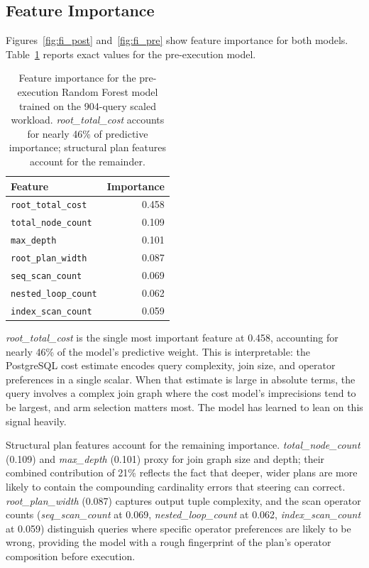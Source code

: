 \documentclass[sigconf,natbib=false]{article}
\newcommand{\postgres}{PostgreSQL}
\newcommand{\feat}[1]{\textit{#1}}
\begin{document}
\subsection{Feature Importance}
\label{sec:ml:features}

Figures~\ref{fig:fi_post} and~\ref{fig:fi_pre} show feature importance for both models.
Table~\ref{tab:feature_imp} reports exact values for the pre-execution model.

\begin{table}[ht]
  \centering
  \caption{Feature importance for the pre-execution Random Forest model trained on the
  904-query scaled workload. \feat{root\_total\_cost} accounts for nearly 46\% of
  predictive importance; structural plan features account for the remainder.}
  \label{tab:feature_imp}
  \small
  \begin{tabular}{@{}lr@{}}
    \toprule
    \textbf{Feature} & \textbf{Importance} \\
    \midrule
    \texttt{root\_total\_cost}   & 0.458 \\
    \texttt{total\_node\_count}  & 0.109 \\
    \texttt{max\_depth}          & 0.101 \\
    \texttt{root\_plan\_width}   & 0.087 \\
    \texttt{seq\_scan\_count}    & 0.069 \\
    \texttt{nested\_loop\_count} & 0.062 \\
    \texttt{index\_scan\_count}  & 0.059 \\
    \bottomrule
  \end{tabular}
\end{table}

\feat{root\_total\_cost} is the single most important feature at 0.458, accounting for
nearly 46\% of the model's predictive weight. This is interpretable: the \postgres{} cost
estimate encodes query complexity, join size, and operator preferences in a single scalar.
When that estimate is large in absolute terms, the query involves a complex join graph
where the cost model's imprecisions tend to be largest, and arm selection matters most.
The model has learned to lean on this signal heavily.

Structural plan features account for the remaining importance. \feat{total\_node\_count}
(0.109) and \feat{max\_depth} (0.101) proxy for join graph size and depth; their combined
contribution of 21\% reflects the fact that deeper, wider plans are more likely to contain
the compounding cardinality errors that steering can correct. \feat{root\_plan\_width}
(0.087) captures output tuple complexity, and the scan operator counts
(\feat{seq\_scan\_count} at 0.069, \feat{nested\_loop\_count} at 0.062,
\feat{index\_scan\_count} at 0.059) distinguish queries where specific operator preferences
are likely to be wrong, providing the model with a rough fingerprint of the plan's operator
composition before execution.
\end{document}
